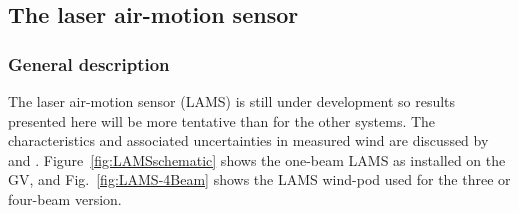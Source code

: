 \documentclass[12pt,twoside,english]{article}\usepackage[]{graphicx}\usepackage[]{color}
\let\OrgIndex\index
\renewcommand*{\index}[1]{\OrgIndex{#1}}
\begin{document}
{{\subsection{The laser air-motion sensor\label{sub:LAMS-description}}

\subsubsection{General description}

The laser air-motion sensor (LAMS) is still under development so results presented here will be more tentative than for the other systems. The characteristics and associated uncertainties in measured wind are discussed by \citet{SpulerEtAl2011} and \citet{CooperEtAl2014}. Figure~\ref{fig:LAMSschematic} shows the one-beam LAMS as installed on the GV, and Fig.~\ref{fig:LAMS-4Beam} shows the LAMS wind-pod used for the three or four-beam version.

}}
\end{document}
